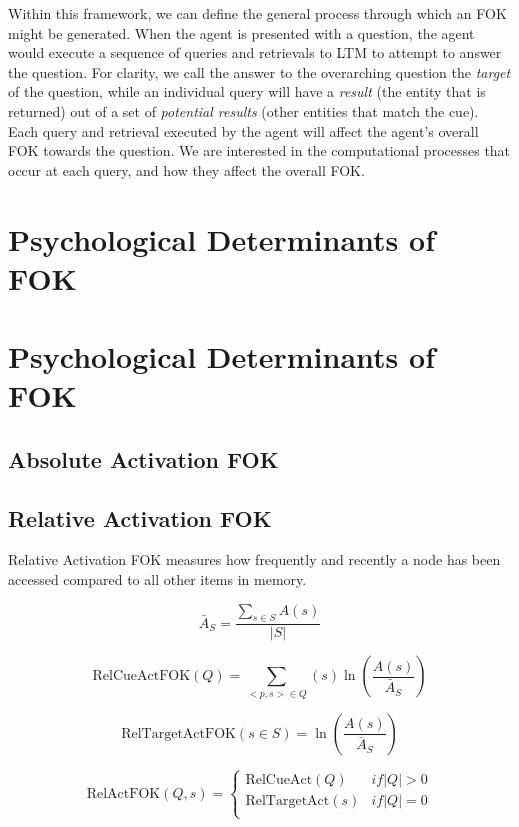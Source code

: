\documentclass[10pt,letterpaper]{article}
\begin{document}
Within this framework, we can define the general process through which an FOK might be generated.
When the agent is presented with a question, the agent would execute a sequence of queries and retrievals to LTM to attempt to answer the question.
For clarity, we call the answer to the overarching question the \emph{target} of the question, while an individual query will have a \emph{result} (the entity that is returned) out of a set of \emph{potential results} (other entities that match the cue).
Each query and retrieval executed by the agent will affect the agent's overall FOK towards the question.
We are interested in the computational processes that occur at each query, and how they affect the overall FOK.


\section{Psychological Determinants of FOK}


\section{Psychological Determinants of FOK}

\subsection{Absolute Activation FOK}

\subsection{Relative Activation FOK}

Relative Activation FOK measures how frequently and recently a node has been accessed compared to all other items in memory.

$$\bar{A}_S = \frac {\sum_{s{\in}S} {A(s)}}{|S|}$$


$$\text{RelCueActFOK}(Q) = \sum_{<p, s> \in Q} (s) \ln(\frac{A(s)}{\bar{A}_S})$$

$$\text{RelTargetActFOK}(s{\in}S) = \ln(\frac{A(s)}{\bar{A}_S})$$

$$\text{RelActFOK}(Q, s) =
\begin{cases}
    \text{RelCueAct}(Q) & {if |Q| > 0} \\
    \text{RelTargetAct}(s)& {if |Q| = 0} \\
\end{cases}
$$
\end{document}
